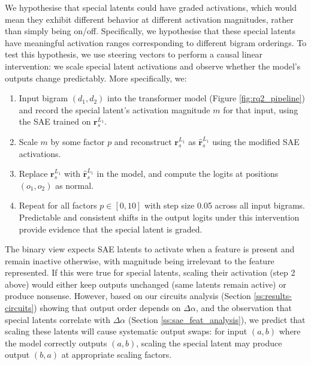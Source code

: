 We hypothesise that special latents could have graded activations, which would mean they exhibit different behavior at different activation magnitudes, rather than simply being on/off. Specifically, we hypothesise that these special latents have meaningful activation ranges corresponding to different bigram orderings. To test this hypothesis, we use steering vectors \cite{ferrando2024primer,arditi2024refusal} to perform a causal linear intervention: we scale special latent activations and observe whether the model's outputs change predictably.
More specifically, we:
\begin{enumerate}
    \item Input bigram $(d_1, d_2)$ into the transformer model (Figure \ref{fig:rq2_pipeline}) and record the special latent's activation magnitude $m$ for that input, using the SAE trained on $\boldsymbol r_{s}^{L_1}$.
    \item Scale $m$ by some factor $p$ and reconstruct $\boldsymbol r_{s}^{L_1}$ as $\hat{\boldsymbol r}_{s}^{L_1}$ using the modified SAE activations.
    \item Replace $\boldsymbol r_{s}^{L_1}$ with $\hat{\boldsymbol r}_{s}^{L_1}$ in the model, and compute the logits at positions $(o_1, o_2)$ as normal.
    \item Repeat for all factors $p \in [0,10]$ with step size 0.05 across all input bigrams. Predictable and consistent shifts in the output logits under this intervention provide evidence that the special latent is graded.
\end{enumerate}
The binary view \cite{quirke2025binary} expects SAE latents to activate when a feature is present and remain inactive otherwise, with magnitude being irrelevant to the feature represented. If this were true for special latents, scaling their activation (step 2 above) would either keep outputs unchanged (same latents remain active) or produce nonsense. However, based on our circuits analysis (Section \ref{ss:results-circuits}) showing that output order depends on $\Delta \alpha$, and the observation that special latents correlate with $\Delta \alpha$ (Section \ref{ss:sae_feat_analysis}), we predict that scaling these latents will cause systematic output swaps: for input $(a,b)$ where the model correctly outputs $(a,b)$, scaling the special latent may produce output $(b,a)$ at appropriate scaling factors.


